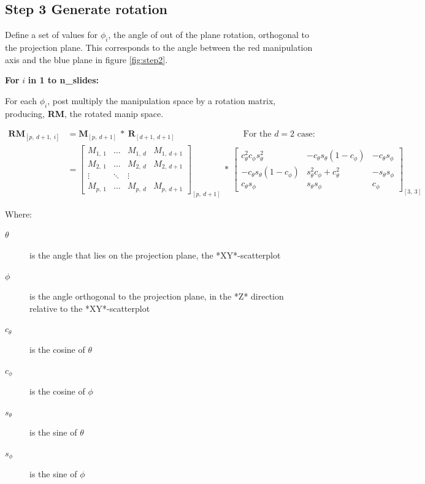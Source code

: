 \documentclass{monashthesis}
\begin{document}
\subsection{Step 3 Generate rotation}\label{step-3-generate-rotation}

Define a set of values for \(\phi_i\), the angle of out of the plane
rotation, orthogonal to the projection plane. This corresponds to the
angle between the red manipulation axis and the blue plane in figure
\ref{fig:step2}.

\textbf{For } \(i\) \textbf{in 1 to n\_slides:}

For each \(\phi_i\), post multiply the manipulation space by a rotation
matrix, producing, \textbf{RM}, the rotated manip space.

\begin{align*}
  \textbf{RM}_{[p,~d+1,~i]}
  &= \textbf{M}_{[p,~d+1]} ~*~ \textbf{R}_{[d+1,~d+1]}
    ~~~~~~~~~~~~~~~~~~~~~~~~~~~~~~~~~~~~\text{For the $d=2$ case:} \\
  &= \begin{bmatrix}
    M_{1,~1} & \dots & M_{1,~d} & M_{1,~d+1} \\
    M_{2,~1} & \dots & M_{2,~d} & M_{2,~d+1} \\
    \vdots   & \ddots& \vdots   \\
    M_{p,~1} & \dots & M_{p,~d} & M_{p,~d+1}
  \end{bmatrix}_{[p,~d+1]}
    ~*~
  \begin{bmatrix}
    c_\theta^2 c_\phi s_\theta^2 &
    -c_\theta s_\theta (1 - c_\phi) &
    -c_\theta s_\phi \\
    -c_\theta s_\theta (1 - c_\phi) &
    s_\theta^2 c_\phi + c_\theta^2 &
    -s_\theta s_\phi \\
    c_\theta s_\phi &
    s_\theta s_\phi &
    c_\phi
  \end{bmatrix}_{[3,~3]}
\end{align*}

Where:

\begin{description}
  \item[$\theta$] is the angle that lies on the projection plane, the *XY*-scatterplot
  \item[$\phi$] is the angle orthogonal to the projection plane, in the *Z* direction relative to the *XY*-scatterplot
  \item[$c_\theta$] is the cosine of $\theta$
  \item[$c_\phi$]   is the cosine of $\phi$
  \item[$s_\theta$] is the sine of   $\theta$
  \item[$s_\phi$]   is the sine of   $\phi$
\end{description}
\end{document}

